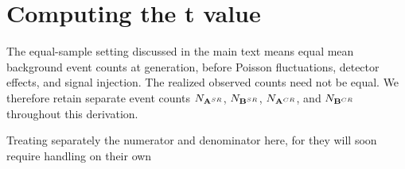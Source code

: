 \documentclass[paper/ddppaper2.tex]{subfiles}
\begin{document}
\section{Computing the t value}\label{Appendix_Tvalue}

The equal-sample setting discussed in the main text means equal mean
background event counts at generation, before Poisson fluctuations,
detector effects, and signal injection. The realized observed counts
need not be equal. We therefore retain separate event counts
$N_{{{\mathbf{A}}^{SR}}}$, $N_{{{\mathbf{B}}^{SR}}}$, $N_{{{\mathbf{A}}^{CR}}}$, and
$N_{{{\mathbf{B}}^{CR}}}$ throughout this derivation.

\iftrue %
\par\medskip{}\medskip
\fi %
 
 

Treating separately the numerator and denominator here, for they will soon require handling on their own
\end{document}
